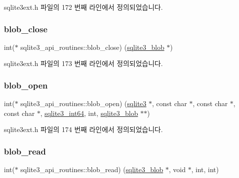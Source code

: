 sqlite3ext.\+h 파일의 172 번째 라인에서 정의되었습니다.

\mbox{\label{structsqlite3__api__routines_a71174a8c435da8c6c45e41286ca89a49}} 
\subsubsection{\texorpdfstring{blob\+\_\+close}{blob\_close}}
{\footnotesize\ttfamily int($\ast$ sqlite3\+\_\+api\+\_\+routines\+::blob\+\_\+close) (\hyperlink{sqlite3_8h_a3eb4857c157c542bb3fb7d8cbf38a662}{sqlite3\+\_\+blob} $\ast$)}



sqlite3ext.\+h 파일의 173 번째 라인에서 정의되었습니다.

\mbox{\label{structsqlite3__api__routines_a31cc427bcbf4b82c9251551c5dcfe28b}} 
\subsubsection{\texorpdfstring{blob\+\_\+open}{blob\_open}}
{\footnotesize\ttfamily int($\ast$ sqlite3\+\_\+api\+\_\+routines\+::blob\+\_\+open) (\hyperlink{sqlite3_8h_a0ef6f2646262c8a9b24368d8ac140f69}{sqlite3} $\ast$, const char $\ast$, const char $\ast$, const char $\ast$, \hyperlink{sqlite3_8h_a0a4d3e6c1ad46f90e746b920ab6ca0d2}{sqlite3\+\_\+int64}, int, \hyperlink{sqlite3_8h_a3eb4857c157c542bb3fb7d8cbf38a662}{sqlite3\+\_\+blob} $\ast$$\ast$)}



sqlite3ext.\+h 파일의 174 번째 라인에서 정의되었습니다.

\mbox{\label{structsqlite3__api__routines_a0813b9f5cea0e7c9fae5713e8226bb7d}} 
\subsubsection{\texorpdfstring{blob\+\_\+read}{blob\_read}}
{\footnotesize\ttfamily int($\ast$ sqlite3\+\_\+api\+\_\+routines\+::blob\+\_\+read) (\hyperlink{sqlite3_8h_a3eb4857c157c542bb3fb7d8cbf38a662}{sqlite3\+\_\+blob} $\ast$, void $\ast$, int, int)}



